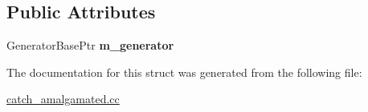 \subsection*{Public Attributes}
\begin{DoxyCompactItemize}
\item 
\mbox{\label{structCatch_1_1Generators_1_1GeneratorTracker_a498ea8e6ace9976202f69600f00a3df2}} 
Generator\+Base\+Ptr {\bfseries m\+\_\+generator}
\end{DoxyCompactItemize}


The documentation for this struct was generated from the following file\+:\begin{DoxyCompactItemize}
\item 
\hyperlink{catch__amalgamated_8cc}{catch\+\_\+amalgamated.\+cc}\end{DoxyCompactItemize}
